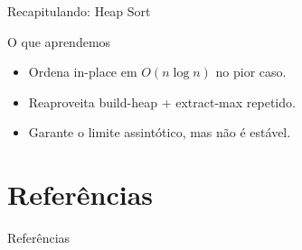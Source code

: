 \documentclass[aspectratio=169]{beamer}
\begin{document}
\begin{frame}{Recapitulando: Heap Sort}
  \begin{block}{O que aprendemos}
    \begin{itemize}
      \item Ordena in-place em $O(n\log n)$ no pior caso.
      \item Reaproveita build-heap + extract-max repetido.
      \item Garante o limite assintótico, mas não é estável.
    \end{itemize}
  \end{block}
\end{frame}

\section*{Referências}
\begin{frame}{Referências}
  \nocite{*}
  
  
\end{frame}
\end{document}

